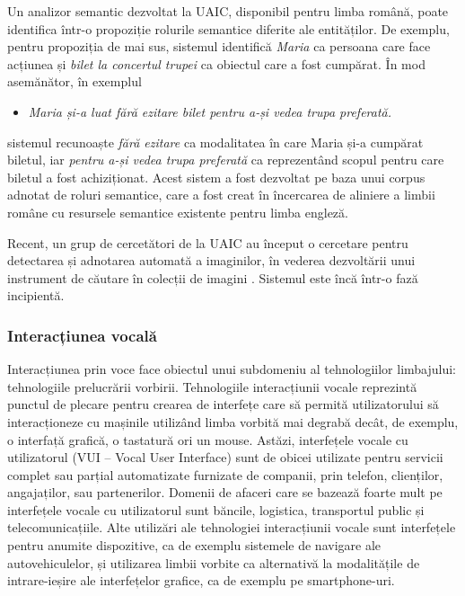 \documentclass[]{../../metanetpaper}
\begin{document}
\begin{multicols}{2}
Un analizor semantic dezvoltat la UAIC\cite{isda}, disponibil pentru limba română, poate identifica într-o propoziție rolurile semantice diferite ale entităților. De exemplu, pentru propoziția de mai sus, sistemul identifică \textit{Maria} ca persoana care face acțiunea și \textit{bilet la concertul trupei} ca obiectul care a fost cumpărat. În mod asemănător, în exemplul

\begin{itemize}
\item\textit{Maria și-a luat fără ezitare bilet pentru a-și vedea trupa preferată.}
\end{itemize}

\noindent
sistemul recunoaște \textit{fără ezitare} ca modalitatea în care Maria și-a cumpărat biletul, iar \textit{pentru a-și vedea trupa preferată} ca reprezentând scopul pentru care biletul a fost achiziționat. Acest sistem a fost dezvoltat pe baza unui corpus adnotat de roluri semantice\cite{trandabat}, care a fost creat în încercarea de aliniere a limbii române cu resursele semantice existente pentru limba engleză.

Recent, un grup de cercetători de la UAIC au început o cercetare pentru detectarea și adnotarea automată a imaginilor, în vederea dezvoltării unui instrument de căutare în colecții de imagini \cite{iftene}. Sistemul este încă într-o fază incipientă.

\subsubsection{Interacțiunea vocală}

Interacțiunea prin voce face obiectul unui subdomeniu al tehnologiilor limbajului: tehnologiile prelucrării vorbirii. Tehnologiile interacțiunii vocale reprezintă punctul de plecare pentru crearea de interfețe care să permită utilizatorului să interacționeze cu mașinile utilizând limba vorbită mai degrabă decât, de exemplu, o interfață grafică, o tastatură ori un mouse. Astăzi, interfețele vocale cu utilizatorul (VUI – Vocal User Interface) sunt de obicei utilizate pentru servicii complet sau parțial automatizate furnizate de companii, prin telefon, clienților, angajaților, sau partenerilor. Domenii de afaceri care se bazează foarte mult pe interfețele vocale cu utilizatorul sunt băncile, logistica, transportul public și telecomunicațiile. Alte utilizări ale tehnologiei interacțiunii vocale sunt interfețele pentru anumite dispozitive, ca de exemplu sistemele de navigare ale autovehiculelor, și utilizarea limbii vorbite ca alternativă la modalitățile de intrare-ieșire ale interfețelor grafice, ca de exemplu pe smartphone-uri.


\end{multicols}
\end{document}
